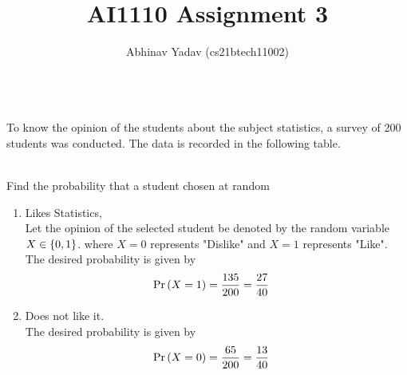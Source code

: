\documentclass[journal,11pt,twocolumn]{IEEEtran}
\begin{document}
    \newcommand*{\permcomb}[4][0mu]{{{}^{#3}\mkern#1#2_{#4}}}
    \newcommand*{\perm}[1][-3mu]{\permcomb[#1]{P}}
    \newcommand*{\comb}[1][-1mu]{\permcomb[#1]{C}}
    \makeatletter
    \makeatother
    \let\StandardTheFigure\thefigure
    \let\vec\mathbf
    \def\putbox#1#2#3{\makebox[0in][l]{\makebox[#1][l]{}\raisebox{\baselineskip}[0in][0in]{\raisebox{#2}[0in][0in]{#3}}}}
        \def\rightbox#1{\makebox[0in][r]{#1}}
        \def\centbox#1{\makebox[0in]{#1}}
        \def\topbox#1{\raisebox{-\baselineskip}[0in][0in]{#1}}
        \def\midbox#1{\raisebox{-0.5\baselineskip}[0in][0in]{#1}}
    \vspace{3cm}
    \title{AI1110 Assignment 3}
    \author{Abhinav Yadav (cs21btech11002)}
    \maketitle
    \newpage

    \\
    To know the opinion of the students about the subject statistics, a survey of 200
    students was conducted. The data is recorded in the following table.
    \begin{table}[ht!]
        
        \caption{}
        \label{tb: Opinion}
    \end{table}\\
    Find the probability that a student chosen at random\\
    \begin{enumerate}
        \item Likes Statistics,\\
        \solution Let the opinion of the selected student be denoted by the random variable $X\in \left\{0, 1\right\}$.
        where $X=0$ represents "Dislike" and $X=1$ represents "Like".\\
        The desired probability is given by
        \begin{align}
            \Pr\left(X=1\right) &= \frac{135}{200} = \frac{27}{40}
        \end{align}

        \item Does not like it.\\
        \solution The desired probability is given by
        \begin{align}
            \Pr\left(X=0\right) &= \frac{65}{200} = \frac{13}{40}
        \end{align}
    \end{enumerate}    
\end{document}
